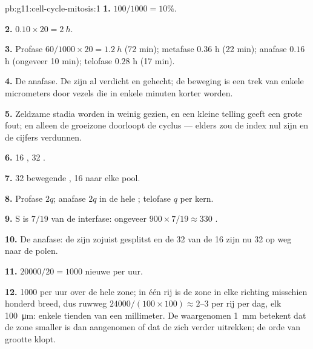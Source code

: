 \begin{solution}{pb:g11:cell-cycle-mitosis:1}
\textbf{1.} $100/1000 = 10\%$.

\textbf{2.} $0.10 \times 20 = \qty{2}{h}$.

\textbf{3.} Profase $60/1000 \times 20 = \qty{1.2}{h}$ (72 min);
metafase $0.36$ h (22 min); anafase $0.16$ h (ongeveer 10 min);
telofase $0.28$ h (17 min).

\textbf{4.} De anafase. De  zijn al verdicht en gehecht; de
beweging is een trek van enkele micrometers door vezels die in enkele
minuten korter worden.

\textbf{5.} Zeldzame stadia worden in weinig  gezien, en een kleine
telling geeft een grote fout; en alleen de groeizone doorloopt de cyclus
--- elders zou de index nul zijn en de cijfers verdunnen.

\textbf{6.} 16 , 32 .

\textbf{7.} 32 bewegende , 16 naar elke pool.

\textbf{8.} Profase $2q$; anafase $2q$ in de hele ; telofase $q$ per
kern.

\textbf{9.} S is $7/19$ van de interfase: ongeveer $900 \times 7/19 \approx
330$ .

\textbf{10.} De anafase: de  zijn zojuist gesplitst en de 32
 van de 16  zijn nu 32  op weg naar de
polen.

\textbf{11.} $\num{20000}/20 = 1000$ nieuwe  per uur.

\textbf{12.} 1000  per uur over de hele zone; in één rij is de zone
in elke richting misschien honderd  breed, dus ruwweg
$\num{24000}/(100 \times 100) \approx 2$--3  per rij per dag, elk
\qty{100}{\micro m}: enkele tienden van een millimeter. De waargenomen
\qty{1}{mm} betekent dat de zone smaller is dan aangenomen of dat de
 zich verder uitrekken; de orde van grootte klopt.


\end{solution}

